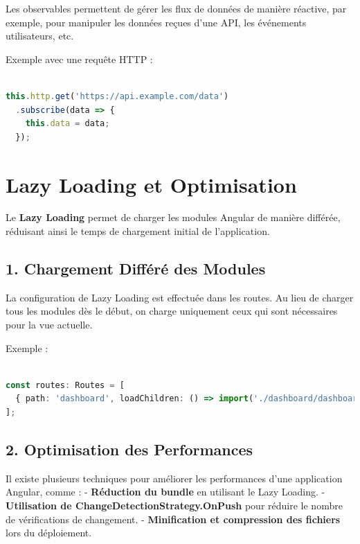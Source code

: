 \documentclass{article}
\begin{document}
Les observables permettent de gérer les flux de données de manière réactive, par exemple, pour manipuler les données reçues d’une API, les événements utilisateurs, etc.

Exemple avec une requête HTTP :
\begin{lstlisting}[language=TypeScript, caption={Using a service in a component}, label={lst:typescript-service-usage}]

this.http.get('https://api.example.com/data')
  .subscribe(data => {
    this.data = data;
  });
\end{lstlisting}

\section*{Lazy Loading et Optimisation}

Le \textbf{Lazy Loading} permet de charger les modules Angular de manière différée, réduisant ainsi le temps de chargement initial de l’application.

\subsection*{1. Chargement Différé des Modules}

La configuration de Lazy Loading est effectuée dans les routes. Au lieu de charger tous les modules dès le début, on charge uniquement ceux qui sont nécessaires pour la vue actuelle.

Exemple :
\begin{lstlisting}[language=TypeScript, caption={Using a service in a component}, label={lst:typescript-service-usage}]

const routes: Routes = [
  { path: 'dashboard', loadChildren: () => import('./dashboard/dashboard.module').then(m => m.DashboardModule) }
];
\end{lstlisting}

\subsection*{2. Optimisation des Performances}

Il existe plusieurs techniques pour améliorer les performances d’une application Angular, comme :
- \textbf{Réduction du bundle} en utilisant le Lazy Loading.
- \textbf{Utilisation de ChangeDetectionStrategy.OnPush} pour réduire le nombre de vérifications de changement.
- \textbf{Minification et compression des fichiers} lors du déploiement.
\end{document}
